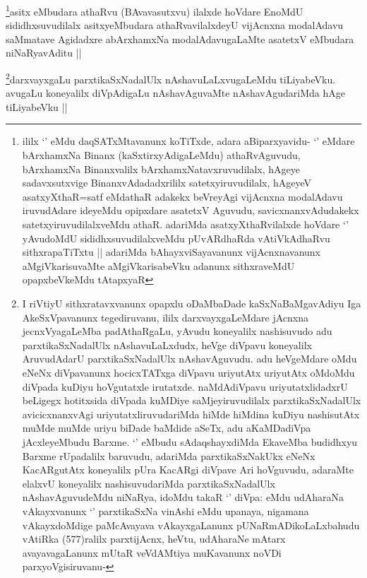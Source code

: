 \begin{artha}
\footnote{ililx `\stext' eMdu daqSATxMtavanunx koTiTxde, adara aBiparxyavidu- `\stext' eMdare bArxhamxNa Binanx (kaSxtirxyAdigaLeMdu) athaRvAguvudu, bArxhamxNa Binanxvalilx bArxhamxNatavxruvudilalx, hAgeye sadavxsutxvige BinanxvAdadadxrililx satetxyiruvudilalx, hAgeyeV asatxyXthaR=satf eMdathaR adakekx beVreyAgi vijAcnxna modalAdavu iruvudAdare ideyeMdu opipxdare asatetxV Aguvudu, savicxnanxvAdudakekx satetxyiruvudilalxveMdu athaR. adariMda asatxyXthaRvilalxde hoVdare `\stext' yAvudoMdU sididhxsuvudilalxveMdu pUvARdhaRda vAtiVkAdhaRvu sithxrapaTiTxtu || adariMda bAhayxviSayavanunx vijAcnxnavanunx aMgiVkarisuvaMte aMgiVkarisabeVku adanunx sithxraveMdU opapxbeVkeMdu tAtapxyaR}asitx eMbudara athaRvu (BAvavasutxvu) ilalxde hoVdare EnoMdU sididhxsuvudilalx asitxyeMbudara athaRvavilalxdeyU vijAcnxna modalAdavu saMmatave Agidadxre abArxhamxNa modalAdavugaLaMte asatetxV eMbudara niNaRyavAditu ||
\end{artha}

\begin{artha}
\footnote{I riVtiyU sithxratavxvanunx opapxlu oDaMbaDade kaSxNaBaMgavAdiyu Iga AkeSxVpavanunx tegediruvanu, ililx darxvayxgaLeMdare jAcnxna jecnxVyagaLeMba padAthaRgaLu, yAvudu koneyalilx nashisuvudo adu parxtikaSxNadalUlx nAshavuLaLxdudx, heVge diVpavu koneyalilx AruvudAdarU parxtikaSxNadalUlx nAshavAguvudu. adu heVgeMdare oMdu eNeNx diVpavanunx hocicxTATxga diVpavu uriyutAtx uriyutAtx oMdoMdu diVpada kuDiyu hoVgutatxle irutatxde. naMdAdiVpavu uriyutatxlidadxrU beLigegx hotitxsida diVpada kuMDiye saMjeyiruvudilalx parxtikaSxNadalUlx avicicxnanxvAgi uriyutatxliruvudariMda hiMde hiMdina kuDiyu nashisutAtx muMde muMde uriyu biDade baMdide aSeTx, adu aKaMDadiVpa jAcxleyeMbudu Barxme. `\stext' eMbudu sAdaqshayxdiMda EkaveMba budidhxyu Barxme rUpadalilx baruvudu, adariMda parxtikaSxNakUkx eNeNx KacARgutAtx koneyalilx pUra KacARgi diVpave Ari hoVguvudu, adaraMte elalxvU koneyalilx nashisuvudariMda parxtikaSxNadalUlx nAshavAguvudeMdu niNaRya, idoMdu takaR `\stext' diVpa: eMdu udAharaNa vAkayxvanunx `\stext' parxtikaSxNa vinAshi eMdu upanaya, nigamana vAkayxdoMdige paMcAvayava vAkayxgaLanunx pUNaRmADikoLaLxbahudu vAtiRka (577)ralilx parxtijAcnx, heVtu, udAharaNe mAtarx avayavagaLanunx mUtaR veVdAMtiya muKavanunx noVDi parxyoVgisiruvanu-}darxvayxgaLu parxtikaSxNadalUlx nAshavuLaLxvugaLeMdu tiLiyabeVku. avugaLu koneyalilx diVpAdigaLu nAshavAguvaMte nAshavAgudariMda hAge tiLiyabeVku ||
\end{artha}

